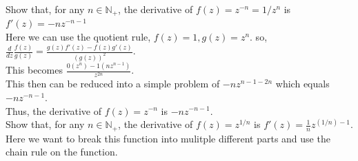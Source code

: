 \documentclass[12pt]{article}
\begin{document}
 Show that, for any $n \in \mathbb{N}_+$, the derivative of $f(z) = z^{-n} = 1/z^n$ is $f'(z) = -nz^{-n-1}$\\
Here we can use the quotient rule, $f(z) = 1, g(z) = z^n$.
so, $\frac{d}{dz} \frac{f(z)}{g(z)} = \frac{g(z)f'(z) - f(z)g'(z)}{(g(z))^2}$.\\
This becomes $\frac{0(z^n) - 1(nz^{n-1})}{z^{2n}}$.\\
This then can be reduced into a simple problem of $-nz^{n-1-2n}$ which equals $-nz^{-n-1}$.\\
Thus, the derivative of $f(z) = z^{-n}$ is $-nz^{-n-1}$.\\

 Show that, for any $n \in \mathbb{N}_+$, the derivative of $f(z) = z^{1/n}$ is $f'(z) = \frac{1}{n}z^{(1/n)-1}$.\\
Here we want to break this function into mulitple different parts and use the chain rule on the function.





 \\


 \\


 \\

 \\

 \\

 \\
\end{document}
